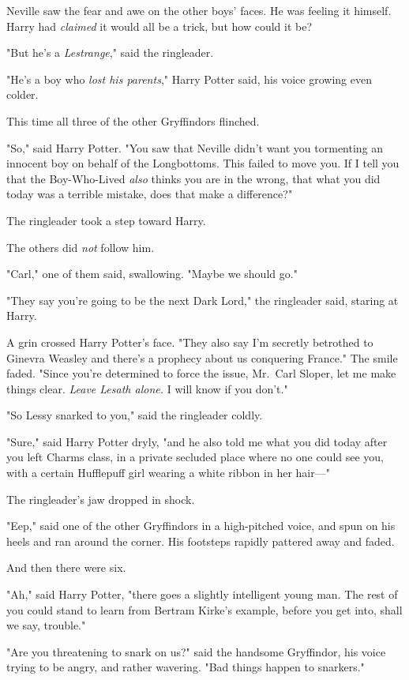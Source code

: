 Neville saw the fear and awe on the other boys' faces. He was feeling it
himself. Harry had \emph{claimed} it would all be a trick, but how could it be?

"But he's a \emph{Lestrange}," said the ringleader.

"He's a boy who \emph{lost his parents}," Harry Potter said, his voice growing
even colder.

This time all three of the other Gryffindors flinched.

"So," said Harry Potter. "You saw that Neville didn't want you tormenting an
innocent boy on behalf of the Longbottoms. This failed to move you. If I tell
you that the Boy-Who-Lived \emph{also} thinks you are in the wrong, that what
you did today was a terrible mistake, does that make a difference?"

The ringleader took a step toward Harry.

The others did \emph{not} follow him.

"Carl," one of them said, swallowing. "Maybe we should go."

"They say you're going to be the next Dark Lord," the ringleader said, staring
at Harry.

A grin crossed Harry Potter's face. "They also say I'm secretly betrothed to
Ginevra Weasley and there's a prophecy about us conquering France." The smile
faded. "Since you're determined to force the issue, Mr.~Carl Sloper, let me
make things clear. \emph{Leave Lesath alone.} I will know if you don't."

"So Lessy snarked to you," said the ringleader coldly.

"Sure," said Harry Potter dryly, "and he also told me what you did today after
you left Charms class, in a private secluded place where no one could see you,
with a certain Hufflepuff girl wearing a white ribbon in her hair---"

The ringleader's jaw dropped in shock.

"Eep," said one of the other Gryffindors in a high-pitched voice, and spun on
his heels and ran around the corner. His footsteps rapidly pattered away and
faded.

And then there were six.

"Ah," said Harry Potter, "there goes a slightly intelligent young man. The rest
of you could stand to learn from Bertram Kirke's example, before you get into,
shall we say, trouble."

"Are you threatening to snark on us?" said the handsome Gryffindor, his voice
trying to be angry, and rather wavering. "Bad things happen to snarkers."

